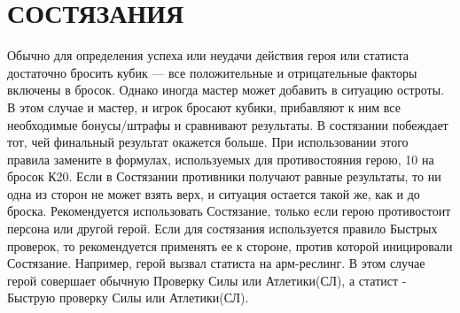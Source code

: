 \section{СОСТЯЗАНИЯ}
Обычно для определения успеха или неудачи действия героя или статиста достаточно бросить кубик — все положительные и отрицательные факторы включены в бросок. Однако иногда мастер может добавить в ситуацию остроты. В этом случае и мастер, и игрок бросают кубики, прибавляют к ним все необходимые бонусы/штрафы и сравнивают результаты. В состязании побеждает тот, чей финальный результат окажется больше. При использовании этого правила замените в формулах, используемых для противостояния герою, 10 на бросок К20.
\newline
Если в Состязании противники получают равные результаты, то ни одна из сторон не может взять верх, и ситуация остается такой же, как и до броска. Рекомендуется использовать Состязание, только если герою противостоит персона или другой герой.
\newline
Если для состязания используется правило Быстрых проверок, то рекомендуется применять ее к стороне, против которой иницировали Состязание. Например, герой вызвал статиста на арм-реслинг. В этом случае герой совершает обычную Проверку Силы или Атлетики(СЛ), а статист - Быструю проверку Силы или Атлетики(СЛ).